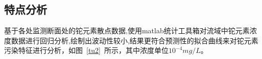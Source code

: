 \documentclass{whutmod}
\begin{document}
\subsection{特点分析}
基于各处监测断面处的铊元素散点数据,使用matlab统计工具箱对流域中铊元素浓度数据进行回归分析,绘制出波动性较小,结果更符合预测性的拟合曲线来对铊元素污染特征进行分析，如图~\ref{tu2}~所示，其中浓度单位$10^{-4}mg/L$。
	\begin{figure} [H]
	\centering 
	\quad

\end{figure}
\end{document}
